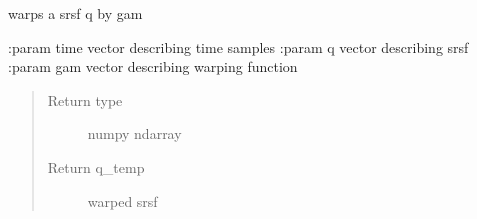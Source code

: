 \documentclass[letterpaper,10pt,english]{sphinxmanual}
\begin{document}
\begin{fulllineitems}
\label{utility_functions:utility_functions.warp_q_gamma}
warps a srsf q by gam

:param time vector describing time samples
:param q vector describing srsf
:param gam vector describing warping function
\begin{quote}\begin{description}
\item[{Return type}] \leavevmode
numpy ndarray

\item[{Return q\_temp}] \leavevmode
warped srsf

\end{description}\end{quote}

\end{fulllineitems}

\end{document}
